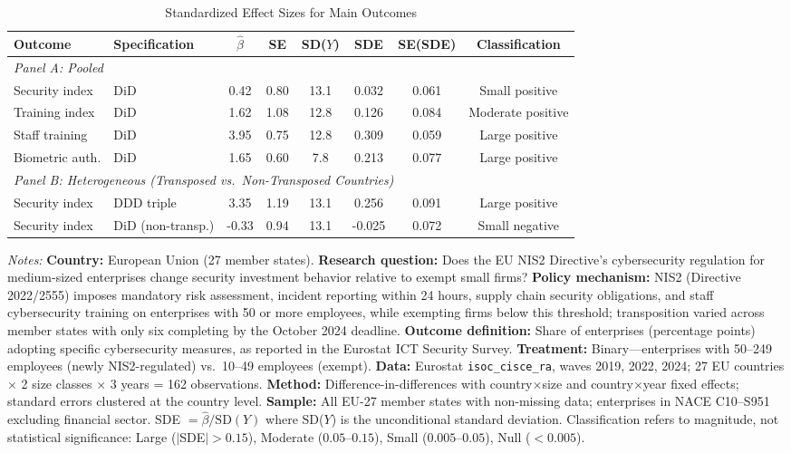 \begin{table}[H]
\centering
\caption{Standardized Effect Sizes for Main Outcomes}
\label{tab:sde}
\begin{threeparttable}
\footnotesize
\begin{tabular}{llcccccc}
\toprule
Outcome & Specification & $\hat{\beta}$ & SE & SD($Y$) & SDE & SE(SDE) & Classification \\
\midrule
\multicolumn{8}{l}{\textit{Panel A: Pooled}} \\
Security index & DiD & 0.42 & 0.80 & 13.1 & 0.032 & 0.061 & Small positive \\
Training index & DiD & 1.62 & 1.08 & 12.8 & 0.126 & 0.084 & Moderate positive \\
Staff training & DiD & 3.95 & 0.75 & 12.8 & 0.309 & 0.059 & Large positive \\
Biometric auth. & DiD & 1.65 & 0.60 & 7.8 & 0.213 & 0.077 & Large positive \\
\midrule
\multicolumn{8}{l}{\textit{Panel B: Heterogeneous (Transposed vs.\ Non-Transposed Countries)}} \\
Security index & DDD triple & 3.35 & 1.19 & 13.1 & 0.256 & 0.091 & Large positive \\
Security index & DiD (non-transp.) & -0.33 & 0.94 & 13.1 & -0.025 & 0.072 & Small negative \\
\bottomrule
\end{tabular}
\begin{tablenotes}[flushleft]
\small
\item \textit{Notes:} \textbf{Country:} European Union (27 member states). \textbf{Research question:} Does the EU NIS2 Directive's cybersecurity regulation for medium-sized enterprises change security investment behavior relative to exempt small firms? \textbf{Policy mechanism:} NIS2 (Directive 2022/2555) imposes mandatory risk assessment, incident reporting within 24 hours, supply chain security obligations, and staff cybersecurity training on enterprises with 50 or more employees, while exempting firms below this threshold; transposition varied across member states with only six completing by the October 2024 deadline. \textbf{Outcome definition:} Share of enterprises (percentage points) adopting specific cybersecurity measures, as reported in the Eurostat ICT Security Survey. \textbf{Treatment:} Binary---enterprises with 50--249 employees (newly NIS2-regulated) vs.\ 10--49 employees (exempt). \textbf{Data:} Eurostat \texttt{isoc\_cisce\_ra}, waves 2019, 2022, 2024; 27 EU countries $\times$ 2 size classes $\times$ 3 years = 162 observations. \textbf{Method:} Difference-in-differences with country$\times$size and country$\times$year fixed effects; standard errors clustered at the country level. \textbf{Sample:} All EU-27 member states with non-missing data; enterprises in NACE C10--S951 excluding financial sector. SDE $= \hat{\beta} / \text{SD}(Y)$ where SD($Y$) is the unconditional standard deviation. Classification refers to magnitude, not statistical significance: Large ($|$SDE$| > 0.15$), Moderate ($0.05$--$0.15$), Small ($0.005$--$0.05$), Null ($< 0.005$).
\end{tablenotes}
\end{threeparttable}
\end{table}

